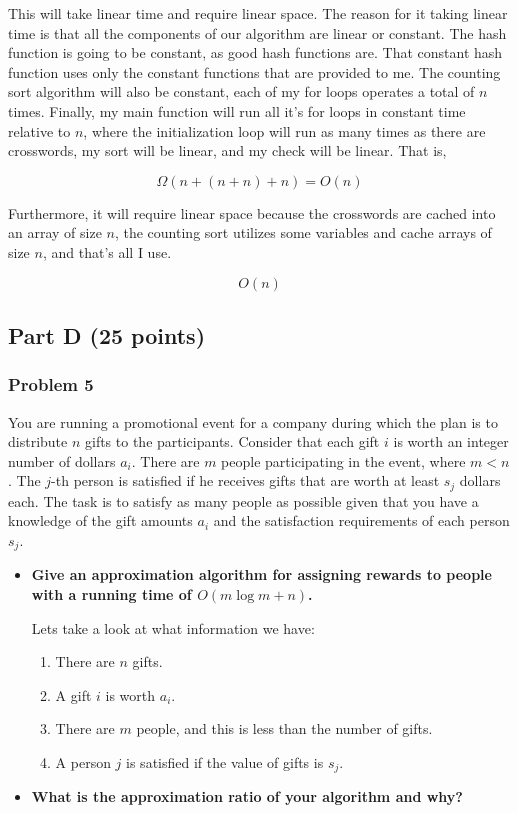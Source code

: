 \documentclass[11pt]{article}
\begin{document}
This will take linear time and require linear space. The reason for it taking
linear time is that all the components of our algorithm are linear or constant.
The hash function is going to be constant, as good hash functions are. That
constant hash function uses only the constant functions that are provided to me.
The counting sort algorithm will also be constant, each of my for loops operates
a total of $n$ times. Finally, my main function will run all it's for loops
in constant time relative to $n$, where the initialization loop will run as many
times as there are crosswords, my sort will be linear, and my check will be linear.
That is,

$$\Omega(n + (n + n) + n) = O(n)$$

Furthermore, it will require linear space because the crosswords are cached
into an array of size $n$, the counting sort utilizes some variables and
cache arrays of size $n$, and that's all I use.

$$O(n)$$

\subsection*{Part D (25 points)}

\subsubsection*{Problem 5} 

You are running a promotional event for a
company during which the plan is to distribute $n$ gifts to the
participants. Consider that each gift $i$ is worth an integer number
of dollars $a_i$. There are $m$ people participating in the event,
where $m < n$. The $j$-th person is satisfied if he receives gifts
that are worth at least $s_j$ dollars each. The task is to satisfy as
many people as possible given that you have a knowledge of the gift
amounts $a_i$ and the satisfaction requirements of each person
$s_j$. 

\begin{itemize}
\item \textbf{Give an approximation algorithm for assigning rewards to people
with a running time of $O(m\log m+n)$.} 

Lets take a look at what information we have:

\begin{enumerate}
\item There are $n$ gifts.
\item A gift $i$ is worth $a_i$.
\item There are $m$ people, and this is less than the number of gifts.
\item A person $j$ is satisfied if the value of gifts is $s_j$.
\end{enumerate}

\item \textbf{What is the approximation ratio of your algorithm and why?}
\end{itemize}
\end{document}
